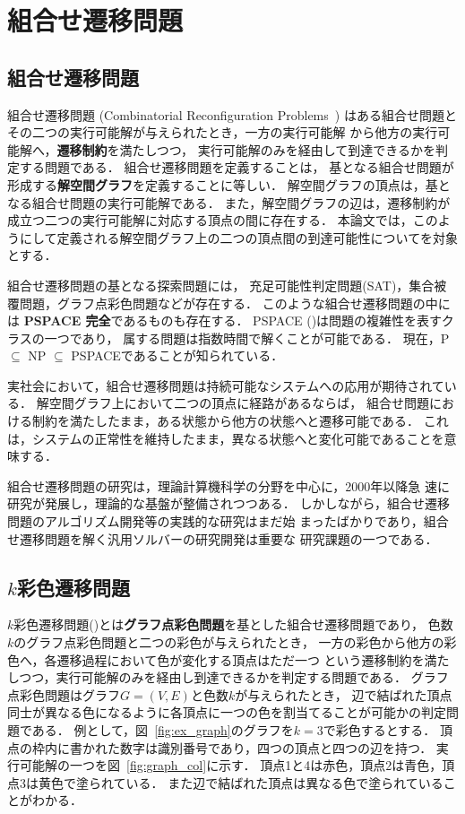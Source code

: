 \chapter{組合せ遷移問題} \label{chap:background}

\section{組合せ遷移問題}
組合せ遷移問題 (Combinatorial Reconfiguration Problems~\cite{Ito18:tohoku})
はある組合せ問題とその二つの実行可能解が与えられたとき，一方の実行可能解
から他方の実行可能解へ，\textbf{遷移制約}を満たしつつ，
実行可能解のみを経由して到達できるかを判定する問題である．
組合せ遷移問題を定義することは，
基となる組合せ問題が形成する\textbf{解空間グラフ}を定義することに等しい．
解空間グラフの頂点は，基となる組合せ問題の実行可能解である． 
また，解空間グラフの辺は，遷移制約が成立つ二つの実行可能解に対応する頂点の間に存在する．
本論文では，このようにして定義される解空間グラフ上の二つの頂点間の到達可能性についてを対象とする．

組合せ遷移問題の基となる探索問題には，
充足可能性判定問題(SAT)，集合被覆問題，グラフ点彩色問題などが存在する．
このような組合せ遷移問題の中には \textbf{PSPACE 完全}であるものも存在する． 
PSPACE (\cite{Kuriyama13:ieice})は問題の複雑性を表すクラスの一つであり，
属する問題は指数時間で解くことが可能である． 
現在，P $\subseteq$ NP $\subseteq$ PSPACEであることが知られている．

実社会において，組合せ遷移問題は持続可能なシステムへの応用が期待されている． 
解空間グラフ上において二つの頂点に経路があるならば，
組合せ問題における制約を満たしたまま，ある状態から他方の状態へと遷移可能である． 
これは，システムの正常性を維持したまま，異なる状態へと変化可能であることを意味する．

組合せ遷移問題の研究は，理論計算機科学の分野を中心に，2000年以降急
速に研究が発展し，理論的な基盤が整備されつつある．
しかしながら，組合せ遷移問題のアルゴリズム開発等の実践的な研究はまだ始
まったばかりであり，組合せ遷移問題を解く汎用ソルバーの研究開発は重要な
研究課題の一つである．

\section{$k$彩色遷移問題}
$k$彩色遷移問題(\cite{BC2009:tcs})とは\textbf{グラフ点彩色問題}を基とした組合せ遷移問題であり， 
色数$k$のグラフ点彩色問題と二つの彩色が与えられたとき，
一方の彩色から他方の彩色へ，各遷移過程において色が変化する頂点はただ一つ
という遷移制約を満たしつつ，実行可能解のみを経由し到達できるかを判定する問題である．
グラフ点彩色問題はグラフ$G=(V, E)$と色数$k$が与えられたとき，
辺で結ばれた頂点同士が異なる色になるように各頂点に一つの色を割当てることが可能かの判定問題である． 
例として，図~\ref{fig:ex_graph}のグラフを$k=3$で彩色するとする．
頂点の枠内に書かれた数字は識別番号であり，四つの頂点と四つの辺を持つ．
実行可能解の一つを図~\ref{fig:graph_col}に示す．
頂点1と4は赤色，頂点2は青色，頂点3は黄色で塗られている．
また辺で結ばれた頂点は異なる色で塗られていることがわかる．

